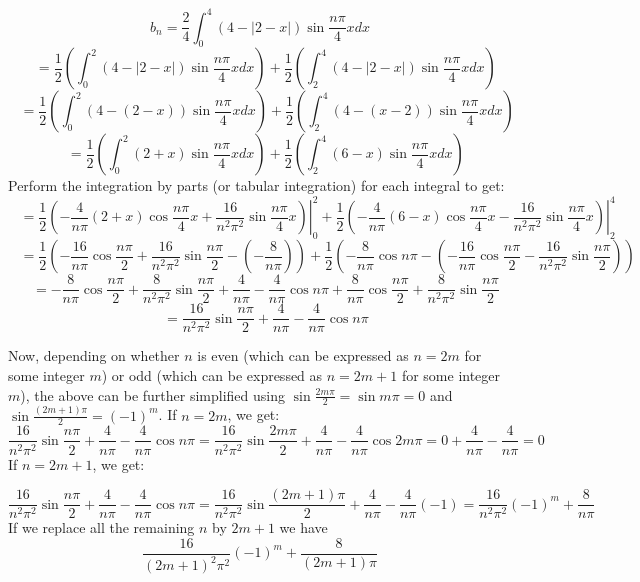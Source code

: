 \documentclass[12pt]{report}
\begin{document}
$$b_n = \frac{2}{4} \int_{0}^{4} (4 - |2-x|) \sin \frac{n\pi}{4} x dx$$
$$ \; \; \; = \frac{1}{2} \left( \int_{0}^{2} (4 - |2-x|) \sin \frac{n\pi}{4} x dx \right) + \frac{1}{2} \left( \int_{2}^{4} (4 - |2-x|) \sin \frac{n\pi}{4} x dx \right) $$
$$ \; \; \; = \frac{1}{2} \left( \int_{0}^{2} (4 - (2-x)) \sin \frac{n\pi}{4} x dx \right) + \frac{1}{2} \left( \int_{2}^{4} (4 - (x-2)) \sin \frac{n\pi}{4} x dx \right) $$
$$ \; \; \; = \frac{1}{2} \left( \int_{0}^{2} (2+x) \sin \frac{n\pi}{4} x dx \right) + \frac{1}{2} \left( \int_{2}^{4} (6 - x) \sin \frac{n\pi}{4} x dx \right) $$
Perform the integration by parts (or tabular integration) for each integral to get:
$$ \; \; \; = \frac{1}{2} \left. \left( -\frac{4}{n\pi} (2+x) \cos \frac{n\pi}{4} x + \frac{16}{n^2\pi^2} \sin \frac{n\pi}{4} x \right) \right\vert_0^2 + \frac{1}{2} \left. \left( -\frac{4}{n\pi} (6 - x) \cos \frac{n\pi}{4} x  - \frac{16}{n^2\pi^2} \sin \frac{n\pi}{4} x \right)\right\vert_2^4 $$
$$ \; \; \; = \frac{1}{2} \left( -\frac{16}{n\pi} \cos \frac{n\pi}{2}  + \frac{16}{n^2\pi^2} \sin \frac{n\pi}{2} - \left(-\frac{8}{n\pi}  \right) \right) + \frac{1}{2} \left( -\frac{8}{n\pi} \cos n\pi  - \left( -\frac{16}{n\pi} \cos \frac{n\pi}{2}  - \frac{16}{n^2\pi^2} \sin \frac{n\pi}{2} \right) \right)  $$
$$ \; \; \; = -\frac{8}{n\pi} \cos \frac{n\pi}{2}  + \frac{8}{n^2\pi^2} \sin \frac{n\pi}{2} + \frac{4}{n\pi}     -\frac{4}{n\pi} \cos n\pi  +\frac{8}{n\pi} \cos \frac{n\pi}{2}  + \frac{8}{n^2\pi^2} \sin \frac{n\pi}{2}  $$
$$ \; \; \; =  \frac{16}{n^2\pi^2} \sin \frac{n\pi}{2} + \frac{4}{n\pi}     -\frac{4}{n\pi} \cos n\pi  $$


Now, depending on whether $n$ is even (which can be expressed as $n=2m$ for some integer $m$) or odd (which can be expressed as $n=2m+1$ for some integer $m$), the above can be further simplified using $\sin \frac{2m\pi}{2} = \sin m\pi =0 $ and $\sin \frac{(2m+1)\pi}{2} = (-1)^m$. If $n=2m$, we get:
$$ \frac{16}{n^2\pi^2} \sin \frac{n\pi}{2} + \frac{4}{n\pi}     -\frac{4}{n\pi} \cos n\pi = \frac{16}{n^2\pi^2} \sin \frac{2m\pi}{2} + \frac{4}{n\pi}     -\frac{4}{n\pi} \cos 2m\pi = 0 +\frac{4}{n\pi}  - \frac{4}{n\pi} =0$$
If $n=2m+1$, we get:

$$ \frac{16}{n^2\pi^2} \sin \frac{n\pi}{2} + \frac{4}{n\pi}     -\frac{4}{n\pi} \cos n\pi =\frac{16}{n^2\pi^2} \sin \frac{(2m+1)\pi}{2} + \frac{4}{n\pi}     -\frac{4}{n\pi} (-1) = \frac{16}{n^2\pi^2} (-1)^m + \frac{8}{n\pi}  $$
If we replace all the remaining $n$ by $2m+1$ we have
$$\frac{16}{(2m+1)^2\pi^2} (-1)^m + \frac{8}{(2m+1)\pi} $$
\end{document}
